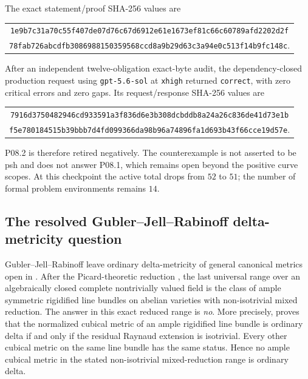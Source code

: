 The exact statement/proof SHA-256 values are
\begin{center}
\small
\begin{tabular}{@{}c@{}}
\nolinkurl{1e9b7c31a70c55f407de07d76c67d6912e61e1673ef81c66c60789afd2202d2f}\\
\nolinkurl{78fab726abcdfb3086988150359568ccd8a9b29d63c3a94e0c513f14b9fc148c}.
\end{tabular}
\end{center}
After an independent twelve-obligation exact-byte audit, the
dependency-closed production request using \texttt{gpt-5.6-sol} at
\texttt{xhigh} returned \texttt{correct}, with zero critical errors and
zero gaps.  Its request/response SHA-256 values are
\begin{center}
\small
\begin{tabular}{@{}c@{}}
\nolinkurl{7916d3750482946cd933591a3f836d6e3b308dcbddb8a24a26c836de41d73e1b}\\
\nolinkurl{f5e780184515b39bbb7d4fd099366da98b96a74896fa1d693b43f66cce19d57e}.
\end{tabular}
\end{center}
P08.2 is therefore retired negatively.  The counterexample is not asserted
to be psh and does not answer P08.1, which remains open beyond the positive
curve scopes.  At this checkpoint the active total drops from $52$ to $51$;
the number of formal problem environments remains $14$.

\subsection{The resolved Gubler--Jell--Rabinoff delta-metricity question}

Gubler--Jell--Rabinoff leave ordinary delta-metricity of general canonical
metrics open in \cite[Remark~16.4]{GJR26}.  After the Picard-theoretic
reduction , the last universal range over an
algebraically closed complete nontrivially valued field is the class of ample
symmetric rigidified line bundles on abelian varieties with non-isotrivial
mixed reduction.  The answer in this exact reduced range is \emph{no}.  More
precisely,
 proves that the normalized cubical
metric of an ample rigidified line bundle is ordinary delta if and only if
the residual Raynaud extension is isotrivial.  Every other cubical metric on
the same line bundle has the same status.  Hence no ample cubical metric in
the stated non-isotrivial mixed-reduction range is ordinary delta.

